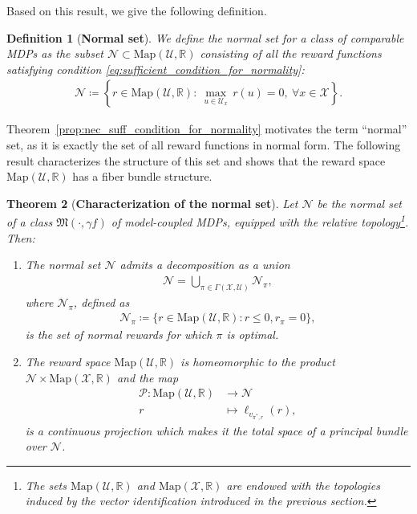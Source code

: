 \documentclass[10pt,leqno]{amsart}
\newcommand{\qmarks}[1]{``#1''}
\newcommand{\R}{\mathbb{R}}
\newcommand{\U}{\mathcal{U}}
\newcommand{\X}{\mathcal{X}}
\newcommand{\cost}{r}
\newcommand{\costfb}[1]{\cost_{#1}}
\newcommand{\vvarg}[1]{v_{#1}}
\newcommand{\f}{f}
\newcommand{\policy}{\pi}
\newcommand{\Sect}{\Gamma(\X, \U)}
\newcommand{\state}{x} %
\newcommand{\act}{u}   %
\newcommand{\disc}{\gamma}
\newcommand{\maps}{\text{Map}}
\newcommand{\actAdvsym}{\ell}
\newcommand{\actAdv}[1]{\actAdvsym_{#1}}
\newcommand{\mdp}{\mathfrak{M}}
\newcommand{\mdparg}[2]{\mdp\left(#1, #2\right)}
\newcommand{\normset}{\mathcal{N}}
\newtheorem{theorem}{Theorem}[]
\newtheorem{definition}[theorem]{Definition}
\begin{document}
\noindent 
Based on this result, we give the following definition.
\begin{definition}[\textbf{Normal set}]
    We define the normal set for a class of comparable MDPs as the subset $\normset \subset \maps(\U, \R)$ consisting of all the reward functions satisfying condition \eqref{eq:sufficient_condition_for_normality}:
    \begin{align}
        \normset \coloneqq \left\{\cost \in \maps(\U, \R) :~ \max_{\act \in \U_\state}\, \cost(\act) = 0, ~ \forall \state \in \X\right\}.
    \end{align}
\end{definition}
\noindent
Theorem~\ref{prop:nec_suff_condition_for_normality} motivates the term \qmarks{normal} set, as it is exactly the set of all reward functions in normal form. The following result characterizes the structure of this set and shows that the reward space $\maps(\U, \R)$ has a fiber bundle structure.
\begin{theorem}[\textbf{Characterization of the normal set}]\label{th:normal_set_characterization}
    Let $\normset$ be the normal set of a class $\mdparg{\cdot}{\disc \f}$ of model-coupled MDPs, equipped with the relative topology\footnote{The sets $\maps(\U, \R)$ and $\maps(\X, \R)$ are endowed with the topologies induced by the vector identification introduced in the previous section.}. Then:
    \begin{enumerate}[label=(\alph*), ref=\thetheorem-(\alph*)]
        \item\label{th:normal_set_sections} The normal set $\normset$ admits a decomposition as a union
        \begin{align}
            \normset = \!\!\bigcup_{\policy \in \Sect}\!\! \normset_\policy,
        \end{align}
        where $\normset_\policy$, defined as
        \begin{align}
            \normset_{\policy} \coloneqq \{\cost \in \maps(\U, \R) : \cost \leq 0, \costfb{\policy} = 0\},
        \end{align}
        is the set of normal rewards for which $\policy$ is optimal.
        \item\label{th:reward_space_as_principal_bundle} The reward space $\maps(\U, \R)$ is homeomorphic to the product $\normset \times \maps(\X, \R)$ and the map
        \begin{subequations}\label{eq:bundle_projection_map}
            \begin{align}
                \mathcal{P} : \maps(\U, \R) &\to \normset\\
                \cost &\mapsto \actAdv{\vvarg{\policy^*\!, \cost}}(\cost),
            \end{align}
        \end{subequations}
        is a continuous projection which makes it the total space of a principal bundle over $\normset$.
    \end{enumerate}
\end{theorem}
\end{document}
